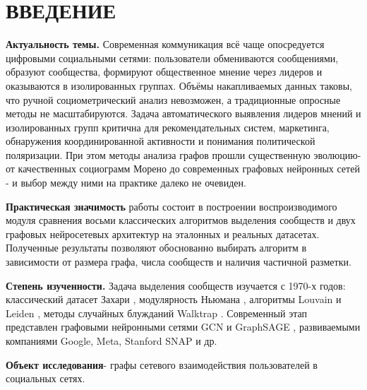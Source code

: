 \documentclass[14pt,a4paper]{extarticle}
\begin{document}
\newpage
\renewcommand{\contentsname}{\hfill\textbf{СОДЕРЖАНИЕ}\hfill}
\tableofcontents

\section*{ВВЕДЕНИЕ}

\textbf{Актуальность темы.} Современная коммуникация всё чаще опосредуется цифровыми социальными сетями: пользователи обмениваются сообщениями, образуют сообщества, формируют общественное мнение через лидеров и оказываются в изолированных группах. Объёмы накапливаемых данных таковы, что ручной социометрический анализ невозможен, а традиционные опросные методы не масштабируются. Задача автоматического выявления лидеров мнений и изолированных групп критична для рекомендательных систем, маркетинга, обнаружения координированной активности и понимания политической поляризации. При этом методы анализа графов прошли существенную эволюцию- от качественных социограмм Морено \cite{moreno1934} до современных графовых нейронных сетей \cite{kipf2017,hamilton2017}- и выбор между ними на практике далеко не очевиден.

\textbf{Практическая значимость} работы состоит в построении воспроизводимого модуля сравнения восьми классических алгоритмов выделения сообществ и двух графовых нейросетевых архитектур на эталонных и реальных датасетах. Полученные результаты позволяют обоснованно выбирать алгоритм в зависимости от размера графа, числа сообществ и наличия частичной разметки.

\textbf{Степень изученности.} Задача выделения сообществ изучается с 1970-х годов: классический датасет Захари \cite{zachary1977}, модулярность Ньюмана \cite{girvan2002}, алгоритмы Louvain \cite{blondel2008} и Leiden \cite{traag2019}, методы случайных блужданий Walktrap \cite{pons2006}. Современный этап представлен графовыми нейронными сетями GCN \cite{kipf2017} и GraphSAGE \cite{hamilton2017}, развиваемыми компаниями Google, Meta, Stanford SNAP \cite{snap} и др.

\textbf{Объект исследования}- графы сетевого взаимодействия пользователей в социальных сетях.
\end{document}
